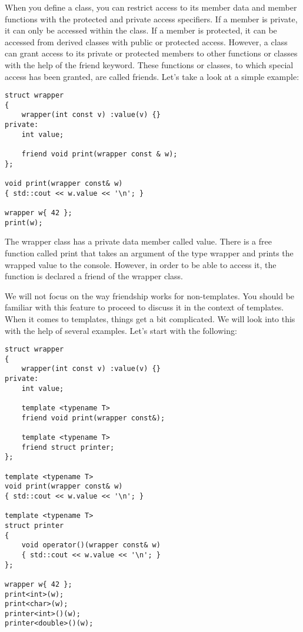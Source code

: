 When you define a class, you can restrict access to its member data and member functions with the protected and private access specifiers. If a member is private, it can only be accessed within the class. If a member is protected, it can be accessed from derived classes with public or protected access. However, a class can grant access to its private or protected members to other functions or classes with the help of the friend keyword. These functions or classes, to which special access has been granted, are called friends. Let’s take a look at a simple example:

\begin{lstlisting}[style=styleCXX]
struct wrapper
{
	wrapper(int const v) :value(v) {}
private:
	int value;
	
	friend void print(wrapper const & w);
};

void print(wrapper const& w)
{ std::cout << w.value << '\n'; }

wrapper w{ 42 };
print(w);
\end{lstlisting}

The wrapper class has a private data member called value. There is a free function called print that takes an argument of the type wrapper and prints the wrapped value to the console. However, in order to be able to access it, the function is declared a friend of the wrapper class.

We will not focus on the way friendship works for non-templates. You should be familiar with this feature to proceed to discuss it in the context of templates. When it comes to templates, things get a bit complicated. We will look into this with the help of several examples. Let’s start with the following:

\begin{lstlisting}[style=styleCXX]
struct wrapper
{
	wrapper(int const v) :value(v) {}
private:
	int value;
	
	template <typename T>
	friend void print(wrapper const&);
	
	template <typename T>
	friend struct printer;
};

template <typename T>
void print(wrapper const& w)
{ std::cout << w.value << '\n'; }

template <typename T>
struct printer
{
	void operator()(wrapper const& w)
	{ std::cout << w.value << '\n'; }
};

wrapper w{ 42 };
print<int>(w);
print<char>(w);
printer<int>()(w);
printer<double>()(w);
\end{lstlisting}

